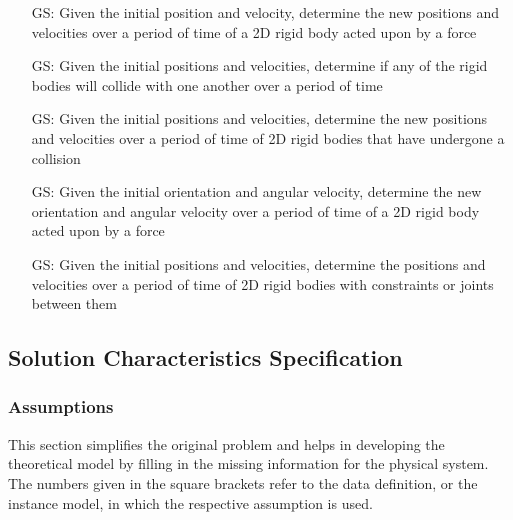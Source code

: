 \documentclass[12pt]{article}
\newcounter{goalnum} %
\begin{document}
\begin{itemize}

\item[GS\refstepcounter{goalnum}\thegoalnum \label{G_gravity}:] Given the initial position and
velocity, determine the new positions and velocities over a period of time of a
2D rigid body acted upon by a force


\item[GS\refstepcounter{goalnum}\thegoalnum  \label{G_detectCollision}:] Given the initial positions and
velocities, determine if any of the rigid bodies will collide with one another over a period of time

\item[GS\refstepcounter{goalnum}\thegoalnum  \label{G_collision}:] Given the initial positions and
velocities, determine the new positions and velocities over a period of time of
2D rigid bodies that have undergone a collision

\item[GS\refstepcounter{goalnum}\thegoalnum \label{G_rotation}:] Given the initial orientation and
angular velocity, determine the new orientation and angular velocity over a
period of time of a 2D rigid body acted upon by a force

\item[GS\refstepcounter{goalnum}\thegoalnum \label{G_constraint}:] Given the initial positions and
velocities, determine the positions and velocities over a period of time of 2D
rigid bodies with constraints or joints between them

\end{itemize}

\subsection{Solution Characteristics Specification}

\subsubsection{Assumptions}
This section simplifies the original problem and helps in developing the
theoretical model by filling in the missing information for the physical
system. The numbers given in the square brackets refer to the data definition,
or the instance model, in which the respective assumption is used.
\end{document}
